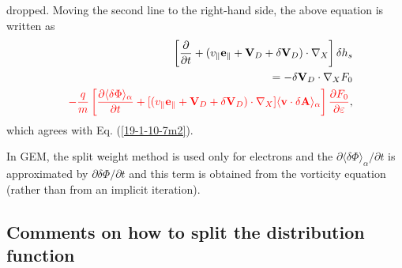 \documentclass{article}
\newcommand{\tmcolor}[2]{{\color{#1}{#2}}}
\begin{document}
dropped. Moving the second line to the right-hand side, the above equation is
written as
\begin{eqnarray}
  &  & \left[ \frac{\partial}{\partial t} + (v_{\parallel}
  \mathbf{e}_{\parallel} +\mathbf{V}_D + \delta \mathbf{V}_D) \cdot \nabla_X
  \right] \delta h_s \nonumber\\
  &  & = - \delta \mathbf{V}_D \cdot \nabla_X F_0 \nonumber\\
  &  & \tmcolor{red}{- \frac{q}{m}  \left[ \frac{\partial \langle \delta \Phi
  \rangle_{\alpha}}{\partial t} + [(v_{\parallel} \mathbf{e}_{\parallel}
  +\mathbf{V}_D + \delta \mathbf{V}_D) \cdot \nabla_X] \langle \mathbf{v}
  \cdot \delta \mathbf{A} \rangle_{\alpha} \right] \frac{\partial
  F_0}{\partial \varepsilon}},  \label{19-1-10-e2}
\end{eqnarray}
which agrees with Eq. (\ref{19-1-10-7m2}).

In GEM, the split weight method is used only for electrons and the $\partial
\langle \delta \Phi \rangle_{\alpha} / \partial t$ is approximated by
$\partial \delta \Phi / \partial t$ and this term is obtained from the
vorticity equation (rather than from an implicit iteration).

\subsection{Comments on how to split the distribution function}
\end{document}
